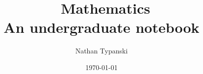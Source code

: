 \title{\textbf{\
Mathematics
}\\An undergraduate notebook}
\author    {Nathan Typanski}
\date      {\today}
\maketitle

\newpage

\cleardoublepage
